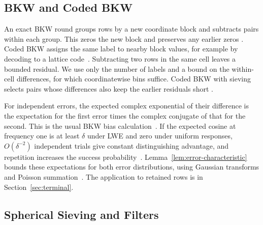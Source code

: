 \documentclass[runningheads,envcountsame,envcountsect,orivec]{llncs}
\begin{document}
\subsection{BKW and Coded BKW}

An exact BKW round groups rows by a new coordinate block
and subtracts pairs within each group. This zeros the new
block and preserves any earlier zeros
\cite{BKW03,ACFFP15}. Coded BKW assigns the same label to nearby block values,
for example by decoding to a lattice code~\cite{GJS15}. Subtracting two rows in
the same cell leaves a bounded residual. We use only
the number of labels and a bound on the within-cell
differences, for which coordinatewise bins suffice.
Coded BKW with sieving selects pairs whose differences
also keep the earlier residuals short
\cite{GJMS17,GJMS19,M19}.

For independent errors, the expected complex exponential of
their difference is the expectation for the first error times
the complex conjugate of that for the second. This is the usual
BKW bias calculation~\cite[Section~3.3]{KF15}.
If the expected cosine at frequency one is at least
$\delta$ under LWE and zero under uniform responses,
$O(\delta^{-2})$ independent trials give constant
distinguishing advantage, and repetition increases the
success probability~\cite[Theorem~2]{KF15}.
Lemma~\ref{lem:error-characteristic} bounds these expectations
for both error distributions, using Gaussian transforms and
Poisson summation~\cite[Appendix~A]{DTV15}. The application to retained rows
is in Section~\ref{sec:terminal}.

\subsection{Spherical Sieving and Filters}
\end{document}
